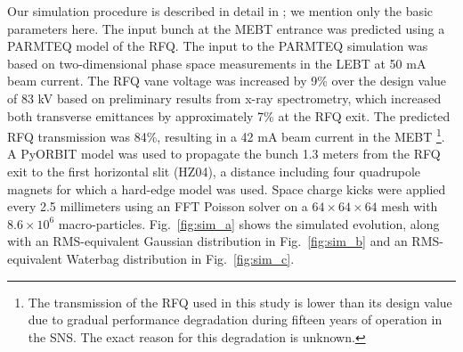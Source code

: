 \documentclass[%
 reprint,
nofootinbib,
 amsmath,amssymb,
 aps,
prstab,
]{revtex4-2}
\begin{document}
Our simulation procedure is described in detail in \cite{Ruisard2020}; we mention only the basic parameters here. The input bunch at the MEBT entrance was predicted using a PARMTEQ \cite{Crandall1988a} model of the RFQ. The input to the PARMTEQ simulation was based on two-dimensional phase space measurements in the LEBT at 50 mA beam current. The RFQ vane voltage was increased by 9\% over the design value of 83 kV based on preliminary results from x-ray spectrometry, which increased both transverse emittances by approximately 7\% at the RFQ exit. The predicted RFQ transmission was 84\%, resulting in a 42 mA beam current in the MEBT \footnote{The transmission of the RFQ used in this study is lower than its design value due to gradual performance degradation during fifteen years of operation in the SNS. The exact reason for this degradation is unknown.}. A PyORBIT \cite{Shishlo2015} model was used to propagate the bunch 1.3 meters from the RFQ exit to the first horizontal slit (HZ04), a distance including four quadrupole magnets for which a hard-edge model was used. Space charge kicks were applied every 2.5 millimeters using an FFT Poisson solver on a $64 \times 64 \times 64$ mesh with $8.6 \times 10^6$ macro-particles. Fig.~\ref{fig:sim_a} shows the simulated evolution, along with an RMS-equivalent Gaussian distribution in Fig.~\ref{fig:sim_b} and an RMS-equivalent Waterbag distribution in Fig.~\ref{fig:sim_c}.
%
\end{document}
